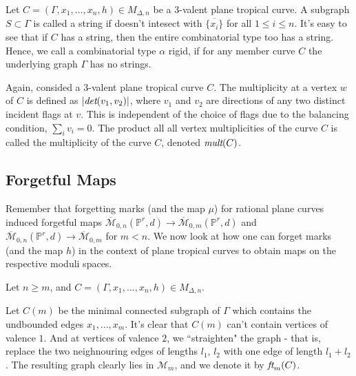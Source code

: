 \begin{definition}
    Let $C = (\Gamma, x_{1},\dots, x_{n}, h) \in M_{\Delta, n}$ be a $3$-valent plane tropical curve. 
    A subgraph $S \subset \Gamma$ is called a string if doesn't intesect with $\overline{\{x_{i}\}}$ for all $1 \leq i \leq n$.
    It's easy to see that if $C$ has a string, then the entire combinatorial type too has a string.
    Hence, we call a combinatorial type $\alpha$ rigid, if for any member curve $C$ the underlying graph $\Gamma$ has no strings.
\end{definition}

\begin{definition}
    Again, consided a $3$-valent plane tropical curve $C$.
    The multiplicity at a vertex $w$ of $C$ is defined as $|\emph{det}(v_{1},v_{2})|$, where $v_{1}$ and $v_{2}$ are directions of any two distinct incident flags at $v$.
    This is independent of the choice of flags due to the balancing condition, $\sum_{i}v_{i} = 0$.
    The product all all vertex multiplicities of the curve $C$ is called the multiplicity of the curve $C$, denoted $\emph{mult}(C)$.
\end{definition}
\subsection{Forgetful Maps}

Remember that forgetting marks (and the map $\mu$) for rational plane curves induced forgetful maps $\overline{\mathcal{M}}_{0,n}(\mathbb{P}^{r},d) \to \overline{\mathcal{M}}_{0,m}(\mathbb{P}^{r},d)$ and $\overline{\mathcal{M}}_{0,n}(\mathbb{P}^{r},d) \to \overline{\mathcal{M}}_{0,m}$ for $m<n$.
We now look at how one can forget marks (and the map $h$) in the context of plane tropical curves to obtain maps on the respective moduli spaces.

\begin{definition}
    Let $n\geq m$, and $C = (\Gamma, x_{1},\dots, x_{n},h) \in M_{\Delta,n}$.
    \par Let $C(m)$ be the minimal connected subgraph of $\Gamma$ which contains the undbounded edges $x_{1}, \dots, x_{m}$.
    It's clear that $C(m)$ can't contain vertices of valence $1$.
    And at vertices of valence $2$, we ``straighten" the graph - that is, replace the two neighnouring edges of lengths $l_{1},\,l_{2}$ with one edge of length $l_{1} + l_{2}$.
    The resulting graph clearly lies in $\mathcal{M}_{m}$, and we denote it by $\emph{ft}_{m}(C)$.
\end{definition}

